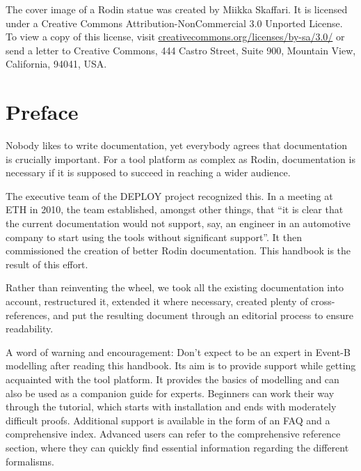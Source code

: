 \documentclass[twoside,10pt]{book}
\begin{document}
The cover image of a Rodin statue was created by Miikka Skaffari.
It is licensed under a Creative Commons Attribution-NonCommercial 3.0 Unported License.  To view a copy of this license, visit \href{http://creativecommons.org/licenses/by-sa/3.0/}{creative\-com\-mons.org/\-licenses/\-by-sa/3.0/} or send a letter to Creative Commons, 444 Castro Street, Suite 900, Mountain View, California, 94041, USA.
\vspace{10em}
\else\fi
\cleardoublepage
{}
{}
\tableofcontents
\fi

\chapter*{Preface}
\label{preface}
\pagestyle{headings}

Nobody likes to write documentation, yet everybody agrees that documentation is crucially important.  For a tool platform as complex as Rodin, documentation is necessary if it is supposed to succeed in reaching a wider audience.

The executive team of the DEPLOY project recognized this. In a meeting at ETH in 2010, the team established, amongst other things, that ``it is clear that the current documentation would not support, say, an engineer in an automotive company to start using the tools without significant support''.  It then commissioned the creation of better Rodin documentation.  This handbook is the result of this effort.

Rather than reinventing the wheel, we took all the existing documentation into account, restructured it, extended it where necessary, created plenty of cross-references, and put the resulting document through an editorial process to ensure readability.

A word of warning and encouragement: Don't expect to be an expert in Event-B modelling after reading this handbook.  Its aim is to provide support while getting acquainted with the tool platform. It provides the basics of modelling and can also be used as a companion guide for experts.  Beginners can work their way through the tutorial, which starts with installation and ends with moderately difficult proofs.  Additional support is available in the form of an FAQ and a comprehensive index.  Advanced users can refer to the comprehensive reference section, where they can quickly find essential information regarding the different formalisms.
\end{document}
